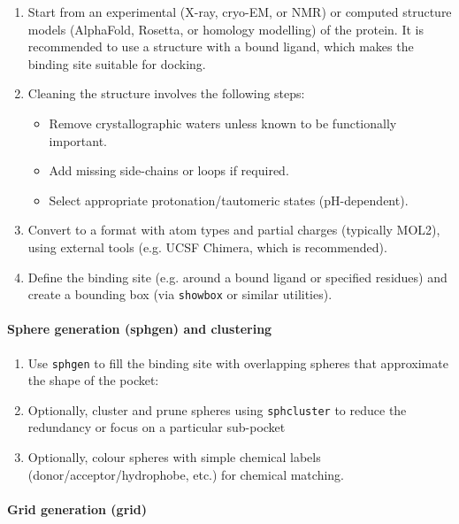 \documentclass[12pt]{article}
\begin{document}
\begin{enumerate}
  \item Start from an experimental (X-ray, cryo-EM, or NMR) or computed structure models (AlphaFold, Rosetta, or homology modelling)  of the protein. It is recommended to use a structure with a bound ligand, which makes the binding site suitable for docking.
    \item Cleaning the structure involves the following steps:
        \begin{itemize}
          \item Remove crystallographic waters unless known to be functionally important.
          \item Add missing side-chains or loops if required.
          \item Select appropriate protonation/tautomeric states (pH-dependent).
        \end{itemize}

  \item Convert to a format with atom types and partial charges
        (typically MOL2), using external tools (e.g. UCSF Chimera, which is recommended).
  \item Define the binding site (e.g. around a bound ligand or specified residues) and create a bounding box (via \verb|showbox| or similar utilities).
\end{enumerate}

\paragraph{Sphere generation (sphgen) and clustering}

\begin{enumerate}
  \item Use \verb|sphgen| to fill the binding site with overlapping spheres that approximate the shape of the pocket:
  \item Optionally, cluster and prune spheres using \verb|sphcluster| to reduce the redundancy or focus on a particular sub-pocket
  \item Optionally, colour spheres with simple chemical labels (donor/acceptor/hydrophobe, etc.) for chemical matching.
\end{enumerate}

\paragraph{Grid generation (grid)}
\end{document}
